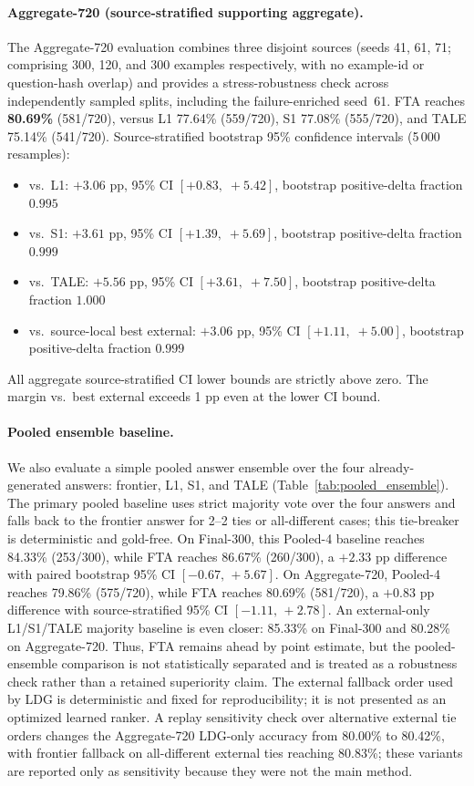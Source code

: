 \documentclass[smallcondensed]{svjour3}
\begin{document}
\paragraph{Aggregate-720 (source-stratified supporting aggregate).}
The Aggregate-720 evaluation combines three disjoint sources (seeds 41, 61, 71;
comprising 300, 120, and 300 examples respectively, with no example-id or
question-hash overlap) and provides a stress-robustness check across
independently sampled splits, including the failure-enriched seed~61.
FTA reaches \textbf{80.69\%} (581/720), versus L1 77.64\% (559/720),
S1 77.08\% (555/720), and TALE 75.14\% (541/720).
Source-stratified bootstrap 95\% confidence intervals (5\,000 resamples):
\begin{itemize}[nosep,leftmargin=1.5em]
  \item vs.\ L1: $+3.06$ pp, 95\% CI $[+0.83,\;+5.42]$, bootstrap
        positive-delta fraction $0.995$
  \item vs.\ S1: $+3.61$ pp, 95\% CI $[+1.39,\;+5.69]$, bootstrap
        positive-delta fraction $0.999$
  \item vs.\ TALE: $+5.56$ pp, 95\% CI $[+3.61,\;+7.50]$, bootstrap
        positive-delta fraction $1.000$
  \item vs.\ source-local best external: $+3.06$ pp, 95\% CI $[+1.11,\;+5.00]$,
        bootstrap positive-delta fraction $0.999$
\end{itemize}
All aggregate source-stratified CI lower bounds are strictly above zero.
The margin vs.\ best external exceeds 1 pp even at the lower CI bound.

\paragraph{Pooled ensemble baseline.}
We also evaluate a simple pooled answer ensemble over the four
already-generated answers: frontier, L1, S1, and TALE
(Table~\ref{tab:pooled_ensemble}).
The primary pooled baseline uses strict majority vote over the four answers
and falls back to the frontier answer for 2--2 ties or all-different cases;
this tie-breaker is deterministic and gold-free.
On Final-300, this Pooled-4 baseline reaches 84.33\% (253/300), while FTA
reaches 86.67\% (260/300), a $+2.33$ pp difference with paired bootstrap
95\% CI $[-0.67,\,+5.67]$.
On Aggregate-720, Pooled-4 reaches 79.86\% (575/720), while FTA reaches
80.69\% (581/720), a $+0.83$ pp difference with source-stratified 95\% CI
$[-1.11,\,+2.78]$.
An external-only L1/S1/TALE majority baseline is even closer: 85.33\% on
Final-300 and 80.28\% on Aggregate-720.
Thus, FTA remains ahead by point estimate, but the pooled-ensemble comparison
is not statistically separated and is treated as a robustness check rather
than a retained superiority claim.
The external fallback order used by LDG is deterministic and fixed for
reproducibility; it is not presented as an optimized learned ranker.
A replay sensitivity check over alternative external tie orders changes the
Aggregate-720 LDG-only accuracy from 80.00\% to 80.42\%, with frontier
fallback on all-different external ties reaching 80.83\%; these variants are
reported only as sensitivity because they were not the main method.
\end{document}
